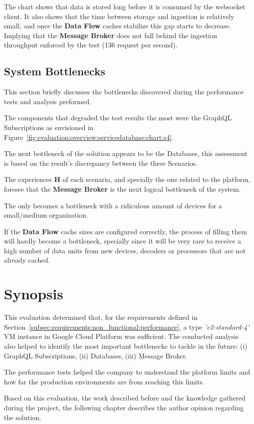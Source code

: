 The chart shows that data is stored long before it is consumed by the websocket client. It also shows that the time between storage and ingestion is relatively small, and once the \textbf{Data Flow} caches stabilize this gap starts to decrease. Implying that the \textbf{Message Broker} does not fall behind the ingestion throughput enforced by the test (136 request per second).

\subsection{System Bottlenecks}
\label{sec:evaluation:overview:bottlenecks}

This section briefly discusses the bottlenecks discovered during the performance tests and analysis preformed.

The components that degraded the test results the most were the GraphQL Subscriptions as envisioned in Figure~\ref{fig:evaluation:overview:servicedatabase:chart:s4}.

The next bottleneck of the solution appears to be the  Databases, this assessment is based on the result's discrepancy between the three Scenarios.

The experiences \textbf{H} of each scenario, and specially the one related to the platform, foresee that the \textbf{Message Broker} is the next logical bottleneck of the system.

The  only becomes a bottleneck with a ridiculous amount of devices for a small/medium organization.

If the \textbf{Data Flow} cache sizes are configured correctly, the process of filling them will hardly become a bottleneck, specially since it will be very rare to receive a high number of data units from new devices, decoders or processors that are not already cached.

\section{Synopsis}
\label{sec:evaluation:synopsis}

This evaluation determined that, for the requirements defined in Section~\ref{subsec:requirements:non_functional:performance}, a type \textit{'e2-standard-4'} \gls{VM} instance in Google Cloud Platform was sufficient. The conducted analysis also helped to identify the most important bottlenecks to tackle in the future: (i) GraphQL Subscriptions, (ii)  Databases, (iii) Message Broker.

The performance tests helped the company to understand the platform limits and how far the production environments are from reaching this limits.

Based on this evaluation, the work described before and the knowledge gathered during the project, the following chapter describes the author opinion regarding the solution.
